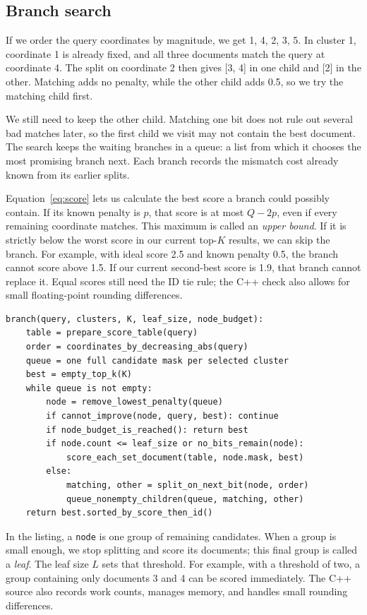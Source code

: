 \subsection{Branch search}
If we order the query coordinates by magnitude, we get 1, 4, 2, 3, 5. In cluster 1,
coordinate 1 is already fixed, and all three documents match the query at coordinate 4.
The split on coordinate 2 then gives [3, 4] in one child and [2] in the other. Matching adds
no penalty, while the other child adds 0.5, so we try the matching child first.

We still need to keep the other child. Matching one bit does not rule out several bad matches
later, so the first child we visit may not contain the best document. The search keeps the
waiting branches in a queue: a list from which it chooses the most promising branch next.
Each branch records the mismatch cost already known from its earlier splits.

Equation~\ref{eq:score} lets us calculate the best score a branch could possibly contain.
If its known penalty is $p$, that score is at most $Q-2p$, even if every remaining coordinate
matches. This maximum is called an \emph{upper bound}. If it is strictly below the worst
score in our current top-$K$ results, we can skip the branch. For example, with ideal score
2.5 and known penalty 0.5, the branch cannot score above 1.5. If our current second-best score
is 1.9, that branch cannot replace it. Equal scores still need the ID tie rule; the C++ check
also allows for small floating-point rounding differences.


\begin{lstlisting}[caption={Bitplane search. The queue preserves alternatives to the preferred path.}]
branch(query, clusters, K, leaf_size, node_budget):
    table = prepare_score_table(query)
    order = coordinates_by_decreasing_abs(query)
    queue = one full candidate mask per selected cluster
    best = empty_top_k(K)
    while queue is not empty:
        node = remove_lowest_penalty(queue)
        if cannot_improve(node, query, best): continue
        if node_budget_is_reached(): return best
        if node.count <= leaf_size or no_bits_remain(node):
            score_each_set_document(table, node.mask, best)
        else:
            matching, other = split_on_next_bit(node, order)
            queue_nonempty_children(queue, matching, other)
    return best.sorted_by_score_then_id()
\end{lstlisting}

In the listing, a \texttt{node} is one group of remaining candidates. When a group is small
enough, we stop splitting and score its documents; this final group is called a \emph{leaf}.
The leaf size $L$ sets that threshold. For example, with a threshold of two, a group containing
only documents 3 and 4 can be scored immediately. The C++ source also records work counts,
manages memory, and handles small rounding differences.

